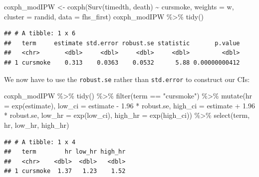 \documentclass[
]{book}
\newenvironment{Shaded}{\begin{snugshade}}{\end{snugshade}}
\newcommand{\AttributeTok}[1]{\textcolor[rgb]{0.77,0.63,0.00}{#1}}
\newcommand{\FloatTok}[1]{\textcolor[rgb]{0.00,0.00,0.81}{#1}}
\newcommand{\FunctionTok}[1]{\textcolor[rgb]{0.00,0.00,0.00}{#1}}
\newcommand{\NormalTok}[1]{#1}
\newcommand{\OtherTok}[1]{\textcolor[rgb]{0.56,0.35,0.01}{#1}}
\newcommand{\SpecialCharTok}[1]{\textcolor[rgb]{0.00,0.00,0.00}{#1}}
\newcommand{\StringTok}[1]{\textcolor[rgb]{0.31,0.60,0.02}{#1}}
\begin{document}
\begin{Shaded}
\begin{Highlighting}[]
\NormalTok{coxph\_modIPW }\OtherTok{\textless{}{-}} \FunctionTok{coxph}\NormalTok{(}\FunctionTok{Surv}\NormalTok{(timedth, death) }\SpecialCharTok{\textasciitilde{}}\NormalTok{ cursmoke, }
                     \AttributeTok{weights =}\NormalTok{ w, }\AttributeTok{cluster =}\NormalTok{ randid,}
                    \AttributeTok{data =}\NormalTok{ fhs\_first)}
\NormalTok{coxph\_modIPW }\SpecialCharTok{\%\textgreater{}\%}
  \FunctionTok{tidy}\NormalTok{()}
\end{Highlighting}
\end{Shaded}

\begin{verbatim}
## # A tibble: 1 x 6
##   term     estimate std.error robust.se statistic       p.value
##   <chr>       <dbl>     <dbl>     <dbl>     <dbl>         <dbl>
## 1 cursmoke    0.313    0.0363    0.0532      5.88 0.00000000412
\end{verbatim}

We now have to use the \texttt{robust.se} rather than \texttt{std.error} to construct our CIs:

\begin{Shaded}
\begin{Highlighting}[]
\NormalTok{coxph\_modIPW }\SpecialCharTok{\%\textgreater{}\%} 
  \FunctionTok{tidy}\NormalTok{() }\SpecialCharTok{\%\textgreater{}\%} 
  \FunctionTok{filter}\NormalTok{(term }\SpecialCharTok{==} \StringTok{"cursmoke"}\NormalTok{) }\SpecialCharTok{\%\textgreater{}\%} 
  \FunctionTok{mutate}\NormalTok{(}\AttributeTok{hr =} \FunctionTok{exp}\NormalTok{(estimate),}
         \AttributeTok{low\_ci =}\NormalTok{ estimate }\SpecialCharTok{{-}} \FloatTok{1.96} \SpecialCharTok{*}\NormalTok{ robust.se, }
         \AttributeTok{high\_ci =}\NormalTok{ estimate }\SpecialCharTok{+} \FloatTok{1.96} \SpecialCharTok{*}\NormalTok{ robust.se, }
         \AttributeTok{low\_hr =} \FunctionTok{exp}\NormalTok{(low\_ci), }
         \AttributeTok{high\_hr =} \FunctionTok{exp}\NormalTok{(high\_ci)) }\SpecialCharTok{\%\textgreater{}\%} 
  \FunctionTok{select}\NormalTok{(term, hr, low\_hr, high\_hr)}
\end{Highlighting}
\end{Shaded}

\begin{verbatim}
## # A tibble: 1 x 4
##   term        hr low_hr high_hr
##   <chr>    <dbl>  <dbl>   <dbl>
## 1 cursmoke  1.37   1.23    1.52
\end{verbatim}
\end{document}
